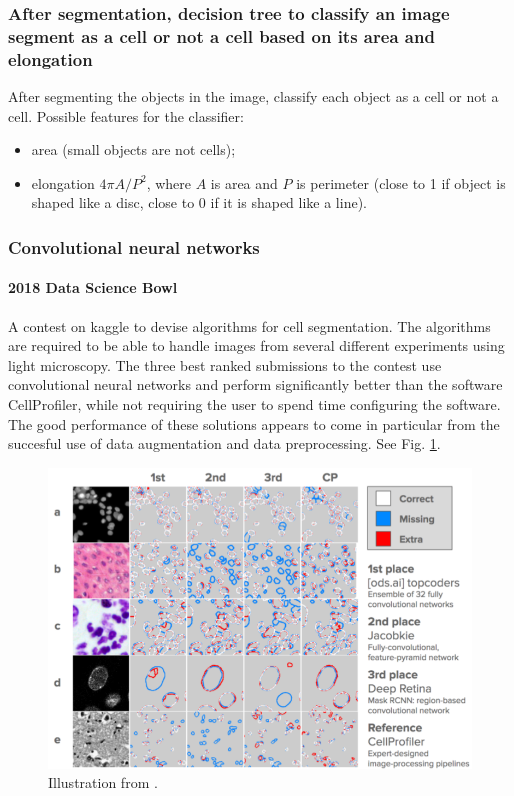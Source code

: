 \documentclass[11pt]{article} %
\begin{document}
    \subsubsection{After segmentation, decision tree to classify an image segment as a cell or not a cell based on its area and elongation \cite{kan:machine}}
After segmenting the objects in the image, classify each object as a cell or not a cell. Possible features for the classifier:
\begin{itemize}
  \item area (small objects are not cells);
  \item elongation $4 \pi A / P^2$, where $A$ is area and $P$ is perimeter (close to 1 if object is shaped like a disc, close to 0 if it is shaped like a line).
\end{itemize}

    \subsubsection{Convolutional neural networks}
       \paragraph{2018 Data Science Bowl \cite{marks:bowl}}
A contest on kaggle to devise algorithms for cell segmentation. The algorithms are required to be able to handle images from several different experiments using light microscopy. The three best ranked submissions to the contest use convolutional neural networks and perform significantly better than the software CellProfiler, while not requiring the user to spend time configuring the software. The good performance of these solutions appears to come in particular from the succesful use of data augmentation and data preprocessing. See Fig. \ref{fig:bowl}.
\begin{figure}[h!]
  \centering
  \includegraphics[width= \linewidth ]{bowl.png}
  \caption{Illustration from \cite{marks:bowl}.}
  \label{fig:bowl}
\end{figure}
\end{document}
